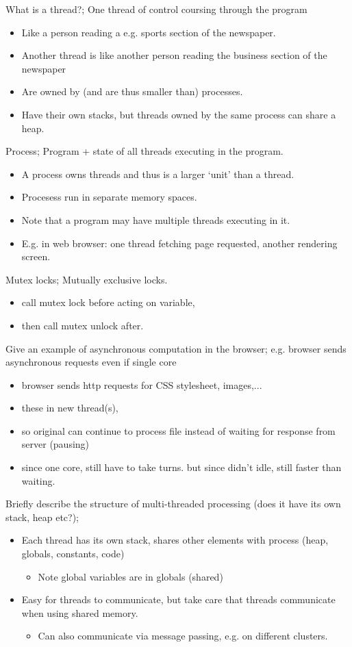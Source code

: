 \documentclass{article}
\begin{document}
What is a thread?; One thread of control coursing through the program \begin{itemize} \item Like a person reading a e.g. sports section of the newspaper. \item Another thread is like another person reading the business section of the newspaper \item Are owned by (and are thus smaller than) processes. \item Have their own stacks, but threads owned by the same process can share a heap. \end{itemize}

Process; Program + state of all threads executing in the program. \begin{itemize} \item A process owns threads and thus is a larger `unit' than a thread. \item Procesess run in separate memory spaces. \item Note that a program may have multiple threads executing in it. \item E.g. in web browser: one thread fetching page requested, another rendering screen. \end{itemize}

Mutex locks; Mutually exclusive locks. \begin{itemize} \item call mutex lock before acting on variable, \item then call mutex unlock after. \end{itemize}

Give an example of asynchronous computation in the browser; e.g. browser sends asynchronous requests even if single core \begin{itemize} \item browser sends http requests for CSS stylesheet, images,... \item these in new thread(s), \item so original can continue to process file instead of waiting for response from server (pausing) \item since one core, still have to take turns. but since didn't idle, still faster than waiting. \end{itemize}

Briefly describe the structure of multi-threaded processing (does it have its own stack, heap etc?); \begin{itemize} \item Each thread has its own stack, shares other elements with process (heap, globals, constants, code) \begin{itemize} \item Note global variables are in globals (shared) \end{itemize} \item Easy for threads to communicate, but take care that threads communicate when using shared memory. \begin{itemize} \item Can also communicate via message passing, e.g. on different clusters. \end{itemize} \end{itemize}
\end{document}
